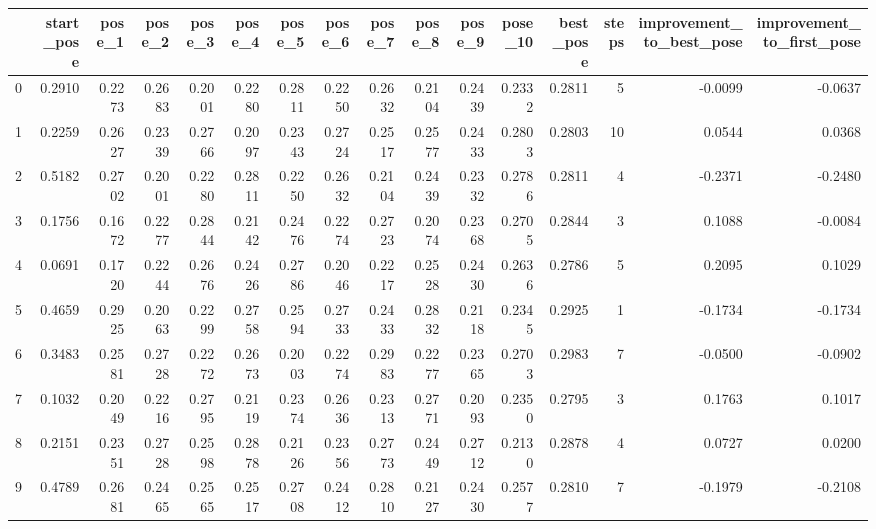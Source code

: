 \begin{tabular}{lrrrrrrrrrrrrrrr}
\toprule
{} &  start\_pose &  pose\_1 &  pose\_2 &  pose\_3 &  pose\_4 &  pose\_5 &  pose\_6 &  pose\_7 &  pose\_8 &  pose\_9 &  pose\_10 &  best\_pose &  steps &  improvement\_to\_best\_pose &  improvement\_to\_first\_pose \\
\midrule
0   &      0.2910 &  0.2273 &  0.2683 &  0.2001 &  0.2280 &  0.2811 &  0.2250 &  0.2632 &  0.2104 &  0.2439 &   0.2332 &     0.2811 &      5 &                   -0.0099 &                    -0.0637 \\
1   &      0.2259 &  0.2627 &  0.2339 &  0.2766 &  0.2097 &  0.2343 &  0.2724 &  0.2517 &  0.2577 &  0.2433 &   0.2803 &     0.2803 &     10 &                    0.0544 &                     0.0368 \\
2   &      0.5182 &  0.2702 &  0.2001 &  0.2280 &  0.2811 &  0.2250 &  0.2632 &  0.2104 &  0.2439 &  0.2332 &   0.2786 &     0.2811 &      4 &                   -0.2371 &                    -0.2480 \\
3   &      0.1756 &  0.1672 &  0.2277 &  0.2844 &  0.2142 &  0.2476 &  0.2274 &  0.2723 &  0.2074 &  0.2368 &   0.2705 &     0.2844 &      3 &                    0.1088 &                    -0.0084 \\
4   &      0.0691 &  0.1720 &  0.2244 &  0.2676 &  0.2426 &  0.2786 &  0.2046 &  0.2217 &  0.2528 &  0.2430 &   0.2636 &     0.2786 &      5 &                    0.2095 &                     0.1029 \\
5   &      0.4659 &  0.2925 &  0.2063 &  0.2299 &  0.2758 &  0.2594 &  0.2733 &  0.2433 &  0.2832 &  0.2118 &   0.2345 &     0.2925 &      1 &                   -0.1734 &                    -0.1734 \\
6   &      0.3483 &  0.2581 &  0.2728 &  0.2272 &  0.2673 &  0.2003 &  0.2274 &  0.2983 &  0.2277 &  0.2365 &   0.2703 &     0.2983 &      7 &                   -0.0500 &                    -0.0902 \\
7   &      0.1032 &  0.2049 &  0.2216 &  0.2795 &  0.2119 &  0.2374 &  0.2636 &  0.2313 &  0.2771 &  0.2093 &   0.2350 &     0.2795 &      3 &                    0.1763 &                     0.1017 \\
8   &      0.2151 &  0.2351 &  0.2728 &  0.2598 &  0.2878 &  0.2126 &  0.2356 &  0.2773 &  0.2449 &  0.2712 &   0.2130 &     0.2878 &      4 &                    0.0727 &                     0.0200 \\
9   &      0.4789 &  0.2681 &  0.2465 &  0.2565 &  0.2517 &  0.2708 &  0.2412 &  0.2810 &  0.2127 &  0.2430 &   0.2577 &     0.2810 &      7 &                   -0.1979 &                    -0.2108 \\

\end{tabular}
